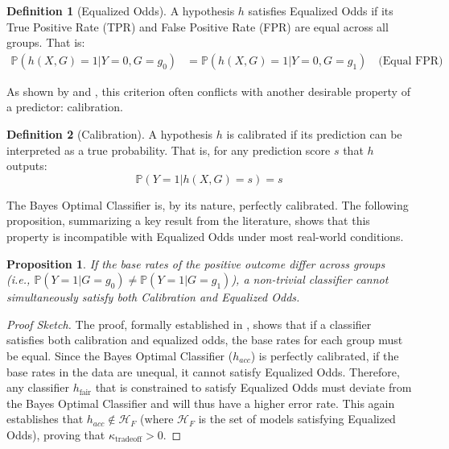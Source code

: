 \documentclass[12pt,a4paper]{article}
\newtheorem{proposition}{Proposition}
\theoremstyle{definition}
\newtheorem{definition}{Definition}
\theoremstyle{remark}
\begin{document}
\begin{definition}[Equalized Odds]
A hypothesis $h$ satisfies Equalized Odds if its True Positive Rate (TPR) and False Positive Rate (FPR) are equal across all groups. That is:
\begin{align}
\mathbb{P}(h(X,G)=1 | Y=0, G=g_0) &= \mathbb{P}(h(X,G)=1 | Y=0, G=g_1) \quad \text{(Equal FPR)}
\end{align}
\end{definition}

As shown by \citet{Kleinberg2017} and \citet{Chouldechova2017}, this criterion often conflicts with another desirable property of a predictor: calibration.

\begin{definition}[Calibration]
A hypothesis $h$ is calibrated if its prediction can be interpreted as a true probability. That is, for any prediction score $s$ that $h$ outputs:
\begin{equation}
\mathbb{P}(Y=1 | h(X,G)=s) = s
\end{equation}
\end{definition}

The Bayes Optimal Classifier is, by its nature, perfectly calibrated. The following proposition, summarizing a key result from the literature, shows that this property is incompatible with Equalized Odds under most real-world conditions.

\begin{proposition}
If the base rates of the positive outcome differ across groups (i.e., $\mathbb{P}(Y=1 | G=g_0) \neq \mathbb{P}(Y=1 | G=g_1)$), a non-trivial classifier cannot simultaneously satisfy both Calibration and Equalized Odds.
\end{proposition}

\begin{proof}[Proof Sketch]
The proof, formally established in \citet{Kleinberg2017}, shows that if a classifier satisfies both calibration and equalized odds, the base rates for each group must be equal. Since the Bayes Optimal Classifier ($h_{acc}$) is perfectly calibrated, if the base rates in the data are unequal, it cannot satisfy Equalized Odds. Therefore, any classifier $h_{\text{fair}}$ that is constrained to satisfy Equalized Odds must deviate from the Bayes Optimal Classifier and will thus have a higher error rate. This again establishes that $h_{acc} \notin \mathcal{H}_F$ (where $\mathcal{H}_F$ is the set of models satisfying Equalized Odds), proving that $\kappa_{\text{tradeoff}} > 0$.
\end{proof}
\end{document}
